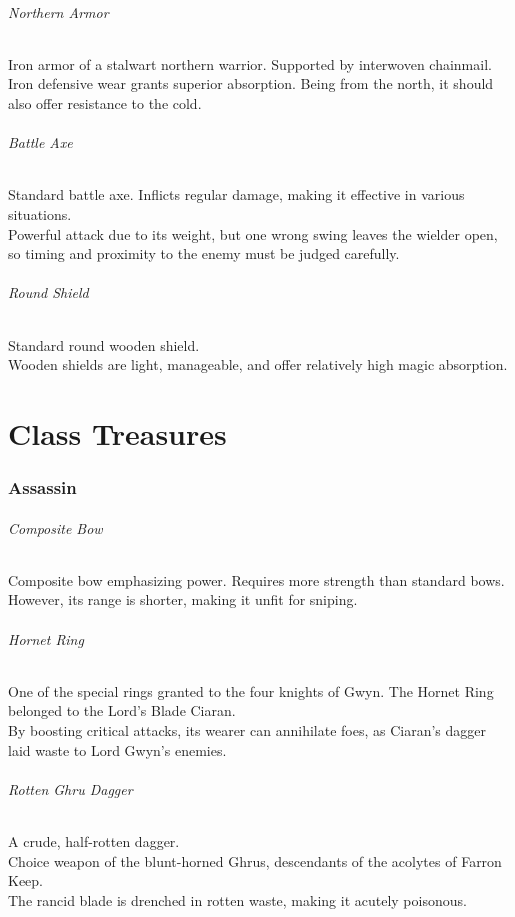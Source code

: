 \documentclass[twocolumn,a4paper]{article}
\begin{document}
\paragraph{Northern Armor}
Iron armor of a stalwart northern warrior. Supported by interwoven chainmail.\\
Iron defensive wear grants superior absorption. Being from the north, it should also offer resistance to the cold. \paragraph{Battle Axe}
Standard battle axe. Inflicts regular damage, making it effective in various situations.\\
Powerful attack due to its weight, but one wrong swing leaves the wielder open, so timing and proximity to the enemy must be judged carefully.
\paragraph{Round Shield}
Standard round wooden shield.\\
Wooden shields are light, manageable, and offer relatively high magic absorption.

\newpage
\part{Class Treasures}
\section*{Assassin}
\paragraph{Composite Bow}
Composite bow emphasizing power. Requires more strength than standard bows.\\
However, its range is shorter, making it unfit for sniping.
\paragraph{Hornet Ring}
One of the special rings granted to the four knights of Gwyn. The Hornet Ring belonged to the Lord's Blade Ciaran.\\
By boosting critical attacks, its wearer can annihilate foes, as Ciaran's dagger laid waste to Lord Gwyn's enemies.
\paragraph{Rotten Ghru Dagger}
A crude, half-rotten dagger.\\
Choice weapon of the blunt-horned Ghrus, descendants of the acolytes of Farron Keep.\\
The rancid blade is drenched in rotten waste, making it acutely poisonous.
\end{document}
